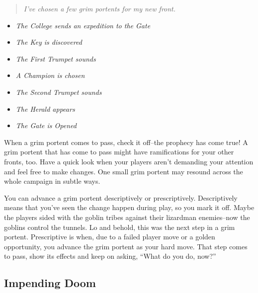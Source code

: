\begin{quote}
\emph{I've chosen a few grim portents for my new front.}
\end{quote}
\begin{itemize}
\item \emph{The College sends an expedition to the Gate}
\item \emph{The Key is discovered}
\item \emph{The First Trumpet sounds}
\item \emph{A Champion is chosen}
\item \emph{The Second Trumpet sounds}
\item \emph{The Herald appears}
\item \emph{The Gate is Opened}

\end{itemize}


When a grim portent comes to pass, check it off--the prophecy has come true! A grim portent that has come to pass might have ramifications for your other fronts, too. Have a quick look when your players aren't demanding your attention and feel free to make changes. One small grim portent may resound across the whole campaign in subtle ways.


You can advance a grim portent descriptively or prescriptively. Descriptively means that you've seen the change happen during play, so you mark it off. Maybe the players sided with the goblin tribes against their lizardman enemies--now the goblins control the tunnels. Lo and behold, this was the next step in a grim portent. Prescriptive is when, due to a failed player move or a golden opportunity, you advance the grim portent as your hard move. That step comes to pass, show its effects and keep on asking, ``What do you do, now?''
\subsection{Impending Doom}


